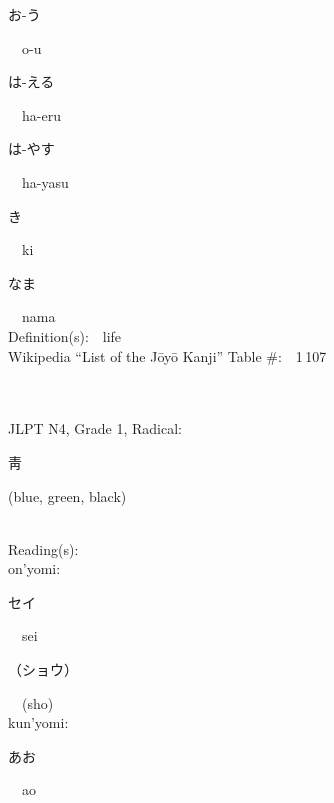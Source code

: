 \begin{multicols}{2}
{\hspace*{2em}}{\begin{CJK}{UTF8}{min} お-う \end{CJK}}\ \ o-u\ \ \\
{\hspace*{2em}}{\begin{CJK}{UTF8}{min} は-える \end{CJK}}\ \ ha-eru\ \ \\
{\hspace*{2em}}{\begin{CJK}{UTF8}{min} は-やす \end{CJK}}\ \ ha-yasu\ \ \\
{\hspace*{2em}}{\begin{CJK}{UTF8}{min} き \end{CJK}}\ \ ki\ \ \\
{\hspace*{2em}}{\begin{CJK}{UTF8}{min} なま \end{CJK}}\ \ nama\ \ \\
Definition(s):\ \ life \\
Wikipedia ``List of the J\=oy\=o Kanji'' Table \#:\ \ 1\,107 \\
\ \ \\
{\fontsize{34pt}{40pt}  }\ \ \\  %
{JLPT N4, Grade 1, Radical:\ \ {\begin{CJK}{UTF8}{min} 靑 \end{CJK}} (blue, green, black) } \\
Reading(s):\ \ \\
{\hspace*{1em}}on'yomi:\ \ \\
{\hspace*{2em}}{\begin{CJK}{UTF8}{min} セイ \end{CJK}}\ \ sei\ \ \\
{\hspace*{2em}}{\begin{CJK}{UTF8}{min} （ショウ） \end{CJK}}\ \ (sho)\ \ \\
{\hspace*{1em}}kun'yomi:\ \ \\
{\hspace*{2em}}{\begin{CJK}{UTF8}{min} あお \end{CJK}}\ \ ao\ \ \\

\end{multicols}
